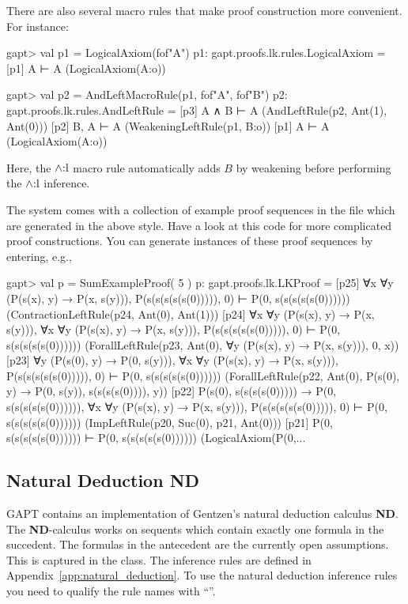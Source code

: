 \documentclass[a4paper,11pt]{book}
\renewcommand{\land}{\wedge}
\newcommand{\ND}{\textbf{ND}}
\newcommand{\mt}[1]{\textnormal{#1}}
\newcommand{\cli}[1]{{\ttfamily {#1}}}
\begin{document}
There are also several macro rules that make proof construction more convenient.
For instance:
\begin{clilisting}
gapt> val p1 = LogicalAxiom(fof"A")
p1: gapt.proofs.lk.rules.LogicalAxiom =
[p1] A ⊢ A    (LogicalAxiom(A:o))

gapt> val p2 = AndLeftMacroRule(p1, fof"A", fof"B")
p2: gapt.proofs.lk.rules.AndLeftRule =
[p3] A ∧ B ⊢ A    (AndLeftRule(p2, Ant(1), Ant(0)))
[p2] B, A ⊢ A    (WeakeningLeftRule(p1, B:o))
[p1] A ⊢ A    (LogicalAxiom(A:o))

\end{clilisting}
Here, the $\land\mt{:l}$ macro rule automatically adds $B$ by weakening before
performing the $\land\mt{:l}$ inference.

The system comes with a collection of example proof sequences in the file
\cli{examples/ProofSequences.scala} which are generated in the above style.
Have a look at this code for more complicated proof constructions.
You can generate instances of these proof sequences by entering, e.g.,
\begin{clilisting}
gapt> val p = SumExampleProof( 5 )
p: gapt.proofs.lk.LKProof =
[p25] ∀x ∀y (P(s(x), y) → P(x, s(y))), P(s(s(s(s(s(0))))), 0) ⊢ P(0, s(s(s(s(s(0))))))    (ContractionLeftRule(p24, Ant(0), Ant(1)))
[p24] ∀x ∀y (P(s(x), y) → P(x, s(y))),
∀x ∀y (P(s(x), y) → P(x, s(y))),
P(s(s(s(s(s(0))))), 0)
⊢
P(0, s(s(s(s(s(0))))))    (ForallLeftRule(p23, Ant(0), ∀y (P(s(x), y) → P(x, s(y))), 0, x))
[p23] ∀y (P(s(0), y) → P(0, s(y))),
∀x ∀y (P(s(x), y) → P(x, s(y))),
P(s(s(s(s(s(0))))), 0)
⊢
P(0, s(s(s(s(s(0))))))    (ForallLeftRule(p22, Ant(0), P(s(0), y) → P(0, s(y)), s(s(s(s(0)))), y))
[p22] P(s(0), s(s(s(s(0))))) → P(0, s(s(s(s(s(0)))))),
∀x ∀y (P(s(x), y) → P(x, s(y))),
P(s(s(s(s(s(0))))), 0)
⊢
P(0, s(s(s(s(s(0))))))    (ImpLeftRule(p20, Suc(0), p21, Ant(0)))
[p21] P(0, s(s(s(s(s(0)))))) ⊢ P(0, s(s(s(s(s(0))))))    (LogicalAxiom(P(0,...

\end{clilisting}

\subsection{Natural Deduction ND}

GAPT contains an implementation of Gentzen's natural deduction calculus {\ND}.
The {\ND}-calculus works on sequents which contain exactly one formula in the succedent.
The formulas in the antecedent are the currently open assumptions. This is captured
in the \cli{NDSequent} class. The inference rules are defined in Appendix~\ref{app:natural_deduction}.
To use the natural deduction inference rules you need to qualify the rule names with ``\cli{nd.}''.
\end{document}
